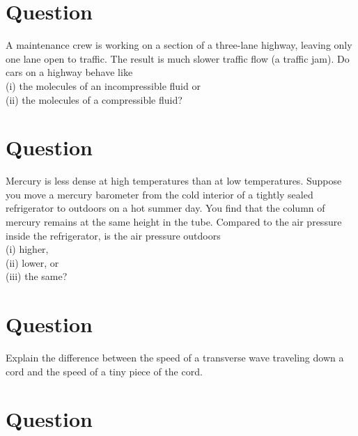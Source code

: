 \documentclass[12pt]{article}
\begin{document}
\setcounter{questions}{1}


\section*{Question \thequestions}

A maintenance crew is working on a section of a three-lane highway, leaving only one
lane open to traffic. The result is much slower traffic flow (a traffic jam). Do cars on a
highway behave like
\vspace{5mm}
\\
(i) the molecules of an incompressible fluid or\\
(ii) the molecules of a compressible fluid?


\section*{Question \thequestions}

Mercury is less dense at high temperatures than at low temperatures. Suppose you move
a mercury barometer from the cold interior of a tightly sealed refrigerator to outdoors
on a hot summer day. You find that the column of mercury remains at the same height
in the tube. Compared to the air pressure inside the refrigerator, is the air pressure outdoors
\vspace{5mm}
\\
(i) higher,\\
(ii) lower, or\\
(iii) the same?


\section*{Question \thequestions}

Explain the difference between the speed of a transverse wave
traveling down a cord and the speed of a tiny piece of the cord.


\section*{Question \thequestions}
\end{document}
